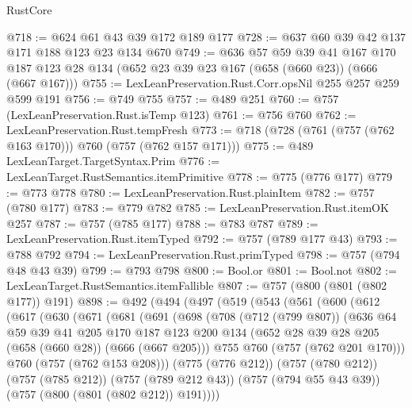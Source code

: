 \begin{lexlean}{RustCore}
\begin{coremodule}
@718 := @624 @61 @43 @39 @172 @189 @177
@728 := @637 @60 @39 @42 @137 @171 @188 @123 @23 @134 @670
@749 := @636
    @57
    @59
    @39
    @41
    @167
    @170
    @187
    @123
    @28
    @134
    (@652 @23 @39 @23 @167 (@658 (@660 @23)) (@666 (@667 @167)))
@755 := LexLeanPreservation.Rust.Corr.opsNil @255 @257 @259 @599 @191
@756 := @749 @755
@757 := @489 @251
@760 := @757 (LexLeanPreservation.Rust.isTemp @123)
@761 := @756 @760
@762 := LexLeanPreservation.Rust.tempFresh
@773 := @718 (@728 (@761 (@757 (@762 @163 @170))) @760 (@757 (@762 @157 @171)))
@775 := @489 LexLeanTarget.TargetSyntax.Prim
@776 := LexLeanTarget.RustSemantics.itemPrimitive
@778 := @775 (@776 @177)
@779 := @773 @778
@780 := LexLeanPreservation.Rust.plainItem
@782 := @757 (@780 @177)
@783 := @779 @782
@785 := LexLeanPreservation.Rust.itemOK @257
@787 := @757 (@785 @177)
@788 := @783 @787
@789 := LexLeanPreservation.Rust.itemTyped
@792 := @757 (@789 @177 @43)
@793 := @788 @792
@794 := LexLeanPreservation.Rust.primTyped
@798 := @757 (@794 @48 @43 @39)
@799 := @793 @798
@800 := Bool.or
@801 := Bool.not
@802 := LexLeanTarget.RustSemantics.itemFallible
@807 := @757 (@800 (@801 (@802 @177)) @191)
@898 := @492
    (@494
      (@497
        (@519
          (@543
            (@561
              (@600
                (@612
                  (@617
                    (@630
                      (@671
                        (@681
                          (@691
                            (@698
                              (@708
                                (@712 (@799 @807))
                                (@636
                                  @64
                                  @59
                                  @39
                                  @41
                                  @205
                                  @170
                                  @187
                                  @123
                                  @200
                                  @134
                                  (@652 @28 @39 @28 @205 (@658 (@660 @28)) (@666 (@667 @205)))
                                  @755
                                  @760
                                  (@757 (@762 @201 @170)))
                                @760
                                (@757 (@762 @153 @208)))
                              (@775 (@776 @212))
                              (@757 (@780 @212))
                              (@757 (@785 @212))
                              (@757 (@789 @212 @43))
                              (@757 (@794 @55 @43 @39))
                              (@757 (@800 (@801 (@802 @212)) @191))))

\end{coremodule}
\end{lexlean}

